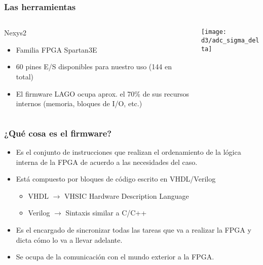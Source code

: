 \documentclass{beamer}
\begin{document}
\begin{frame}
\frametitle{Las herramientas}
  \begin{columns}
    \begin{column}{0.45\textwidth}
      \begin{block}{Nexys2}
        \begin{itemize}
          \item  Familia FPGA Spartan3E
          \item  60 pines E/S disponibles para nuestro uso (144 en total)
          \item  El firmware LAGO ocupa aprox. el 70\% de sus recursos internos
                 (memoria, bloques de I/O, etc.)
        \end{itemize}
      \end{block}
    \end{column} 
    \begin{column}{0.65\textwidth}
      \texttt{[image: d3/adc\_sigma\_delta]}
    \end{column}
  \end{columns}
\end{frame}

\begin{frame}
  \frametitle{¿Qué cosa es el firmware?}
    \begin{block}{}
      \begin{itemize}
        \pause
        \item Es el conjunto de instrucciones que realizan el ordenamiento de la
              lógica interna de la FPGA de acuerdo a las necesidades del caso.
        \pause
        \item Está compuesto por bloques de código escrito en VHDL/Verilog
          \begin{itemize}
            \item VHDL $\rightarrow$ VHSIC Hardware Description Language
            \item Verilog $\rightarrow$ Sintaxis similar a C/C++
          \end{itemize}
        \pause
        \item Es el encargado de sincronizar todas las tareas que va a realizar
              la FPGA y dicta cómo lo va a llevar adelante.
        \pause
        \item Se ocupa de la comunicación con el mundo exterior a la FPGA.
      \end{itemize}
    \end{block}
\end{frame}
\end{document}
